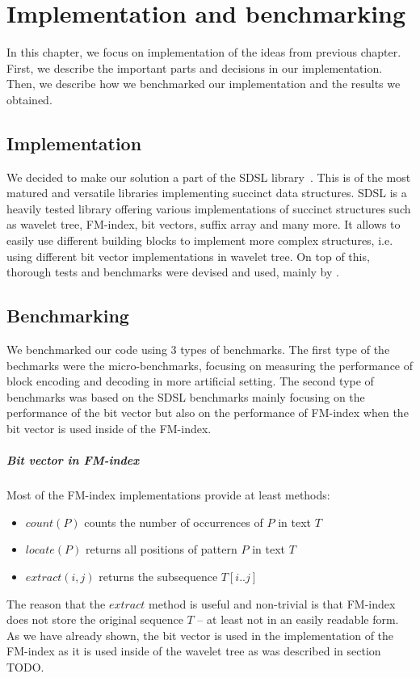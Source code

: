 \chapter{Implementation and benchmarking}
\label{kap:kap4}

In this chapter, we focus on implementation of the ideas from previous chapter.
First, we describe the important parts and decisions in our implementation. Then,
we describe how we benchmarked our implementation and the results we obtained.

\section{Implementation}

We decided to make our solution a part of the SDSL library~\citep{gog2014theory}. This
is of the most matured and versatile libraries implementing succinct data structures.
SDSL is a heavily tested library offering various implementations of succinct
structures such as wavelet tree, FM-index, bit vectors, suffix array and many more.
It allows to easily use different building blocks to implement more complex structures,
i.e. using different bit vector implementations in wavelet tree. On top of this, thorough
tests and benchmarks were devised and used, mainly by \cite{gog2014optimized}.

\section{Benchmarking}

We benchmarked our code using 3 types of benchmarks. The first type of the bechmarks
were the micro-benchmarks, focusing on measuring the performance of block encoding
and decoding in more artificial setting. The second type of benchmarks was based on
the SDSL benchmarks mainly focusing on the performance of the bit vector but also
on the performance of FM-index when the bit vector is used inside of the FM-index.

\paragraph{Bit vector in FM-index}
Most of the FM-index implementations provide at least methods:
\begin{itemize}
	\item $\mathit{count}(P)$ counts the number of occurrences of $P$ in text $T$
	\item $\mathit{locate}(P)$ returns all positions of pattern $P$ in text $T$
	\item $\mathit{extract}(i, j)$ returns the subsequence $T[i..j]$
\end{itemize}
The reason that the $\mathit{extract}$ method is useful and non-trivial is that FM-index
does not store the original sequence $T$ -- at least not in an easily readable form.
As we have already shown, the bit vector is used in the implementation of the FM-index as it is
used inside of the wavelet tree as was described in section TODO.